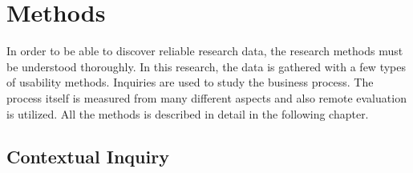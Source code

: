 \documentclass[12pt,a4paper,oneside,pdftex]{report}
\begin{document}



% 

\chapter{Methods}
\label{chapter:methods}
In order to be able to discover reliable research data, the research methods must be understood thoroughly. In this research, the data is gathered with a few types of usability methods.
Inquiries are used to study the business process. The process itself is measured from many different aspects and also remote evaluation is utilized.
All the methods is described in detail in the following chapter. 


\section{Contextual Inquiry}
\label{sec:cinquiry}
    
\end{document}
